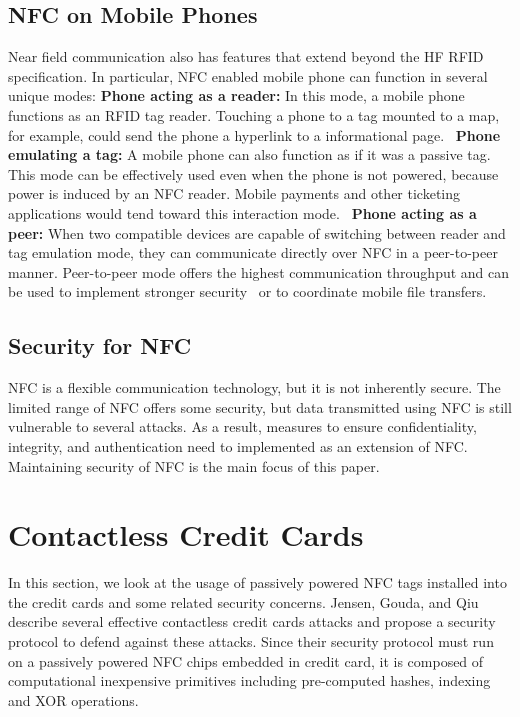 \documentclass{sig-alternate}
\begin{document}
\subsection{NFC on Mobile Phones}
\label{sec:nfcOnPhones}
Near field communication also has features that extend beyond the HF RFID specification. In particular, NFC enabled mobile phone can function in several unique modes:
\vspace{2mm}\newline
\textbf{Phone acting as a reader:}
In this mode, a mobile phone functions as an RFID tag reader. Touching a phone to a tag mounted to a map, for example, could send the phone a hyperlink to a informational page.~\cite{staticDynamicDisplays}
\vspace{2mm}\newline
\textbf{Phone emulating a tag:}
A mobile phone can also function as if it was a passive tag. This mode can be effectively used even when the phone is not powered, because power is induced by an NFC reader. Mobile payments and other ticketing applications would tend toward this interaction mode.~\cite{Gum2013}
\vspace{2mm}\newline
\textbf{Phone acting as a peer:}
When two compatible devices are capable of switching between reader and tag emulation mode, they can communicate directly over NFC in a peer-to-peer manner. Peer-to-peer mode offers the highest communication throughput and can be used to implement stronger security~\cite{Ticket2011} or to coordinate mobile file transfers.~\cite{Gum2013}

\subsection{Security for NFC}
\label{sec:backgroundSecurity}
NFC is a flexible communication technology, but it is not inherently secure. The limited range of NFC offers some security, but data transmitted using NFC is still vulnerable to several attacks. As a result, measures to ensure confidentiality, integrity, and authentication need to implemented as an extension of NFC. Maintaining security of NFC is the main focus of this paper.~\cite{CC2016}



\section{Contactless Credit Cards}
\label{sec:creditCard}
In this section, we look at the usage of passively powered NFC tags installed into the  credit cards and some related security concerns. Jensen, Gouda, and Qiu describe several effective contactless credit cards attacks and propose a security protocol to defend against these attacks. Since their security protocol must run on a passively powered NFC chips embedded in credit card, it is composed of computational inexpensive primitives including pre-computed hashes, indexing and XOR operations.~\cite{CC2016}
\end{document}
